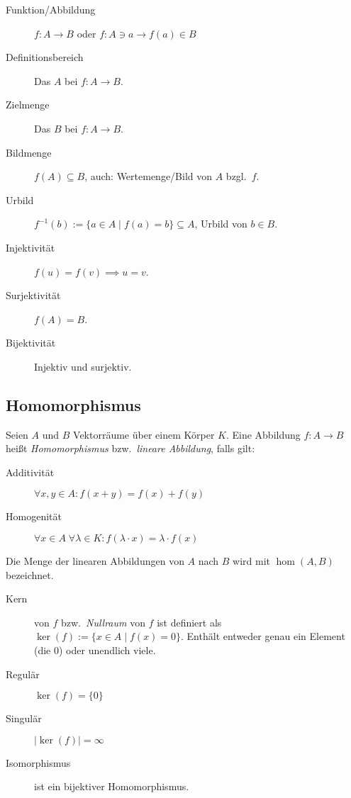 \begin{description}
  \item [Funktion/Abbildung] 
	$f:A\rightarrow B$ oder $f:A\ni a\rightarrow f(a)\in B$
  \item [Definitionsbereich] 
	Das $A$ bei $f:A\rightarrow B$.
  \item [Zielmenge] 
	Das $B$ bei $f:A\rightarrow B$.
  \item [Bildmenge] 
	$f(A)\subseteq B$, auch: Wertemenge\slash{}Bild von $A$ bzgl.~$f$.
  \item [Urbild] 
	$f^{-1}(b):=\{a\in A\mid f(a)=b\}\subseteq A$, Urbild von $b\in B$.
  \item [Injektivität] 
	$f(u)=f(v) \implies u=v$.
  \item [Surjektivität] 
	$f(A)=B$.
  \item [Bijektivität] 
	Injektiv und surjektiv.
\end{description}

\subsection{Homomorphismus}

Seien $A$ und $B$ Vektorräume über einem Körper $K$\@.
Eine Abbildung $f : A\rightarrow B$ heißt \emph{Homomorphismus} bzw.~\emph{lineare Abbildung}, falls gilt:
\begin{description}
  \item [Additivität] $\forall x,y\in A : f(x+y)=f(x)+f(y)$
  \item [Homogenität] $\forall x\in A\;\forall\lambda\in K : f(\lambda\cdot x)=\lambda\cdot f(x)$
\end{description}

Die Menge der linearen Abbildungen von $A$ nach $B$ wird mit $\hom(A,B)$ bezeichnet.
\begin{description}
  \item [Kern] 
	von $f$ bzw.~\emph{Nullraum} von $f$ ist definiert als $\ker(f) := \{ x \in A \mid f(x)=0 \}$.
	Enthält entweder genau ein Element (die 0) oder unendlich viele.
  \item [Regulär] 
	$\ker(f)=\{0\}$
  \item [Singulär] 
	$\lvert\ker(f)\rvert = \infty$
  \item [Isomorphismus] 
	ist ein bijektiver Homomorphismus.
\end{description}

